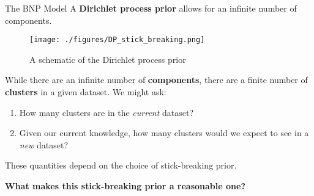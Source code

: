 \begin{frame}{The BNP Model}
A {\bf Dirichlet process prior} allows for an infinite number of components.
\vspace{-0.2in}
\begin{figure}[!h]
\centering
\texttt{[image: ./figures/DP\_stick\_breaking.png]}
\caption{A schematic of the Dirichlet process prior}
\end{figure}
\vspace{-0.2in}

While there are an infinite number of {\bf components}, there are a finite number of {\bf clusters} in a given dataset. \pause We might ask:

\begin{enumerate}[(1)]
\item How many clusters are in the {\itshape current} dataset?

\pause
\item Given our current knowledge, how many clusters would we expect to see in a {\itshape new} dataset?

\end{enumerate}

\pause

These quantities depend on the choice of stick-breaking prior.

\pause

\begin{mdframed}[style=MyFrame]
\begin{center}
{\bf What makes this stick-breaking prior a reasonable one?}
\end{center}
\end{mdframed}

\end{frame}
